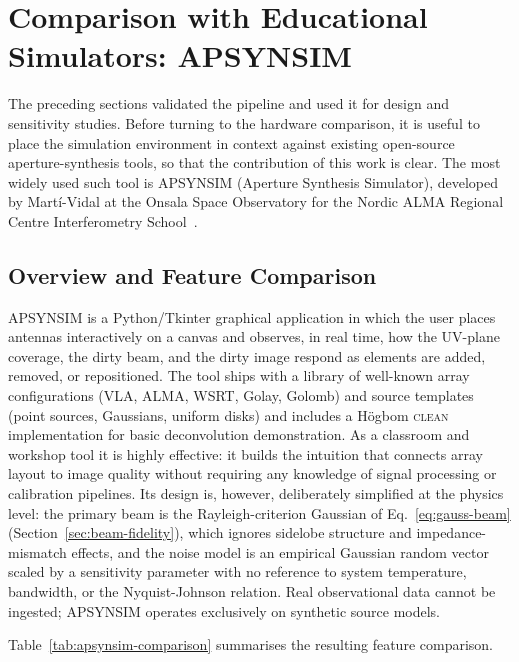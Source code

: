\section{Comparison with Educational Simulators: \textsc{APSYNSIM}}
\label{sec:apsynsim}

The preceding sections validated the pipeline and used it for design and sensitivity
studies. Before turning to the hardware comparison, it is useful to place the
simulation environment in context against existing open-source aperture-synthesis
tools, so that the contribution of this work is clear. The most widely used such tool
is \textsc{APSYNSIM} (Aperture Synthesis Simulator), developed by
Mart\'i-Vidal at the Onsala Space Observatory for the Nordic ALMA Regional Centre
Interferometry School~\cite{apsynsim}.

\subsection{Overview and Feature Comparison}

\textsc{APSYNSIM} is a Python/Tkinter graphical application in which the user places
antennas interactively on a canvas and observes, in real time, how the UV-plane
coverage, the dirty beam, and the dirty image respond as elements are added, removed,
or repositioned. The tool ships with a library of well-known array configurations
(VLA, ALMA, WSRT, Golay, Golomb) and source templates (point sources, Gaussians,
uniform disks) and includes a H\"ogbom \textsc{clean}~\citep{hogbom1974} implementation for basic
deconvolution demonstration. As a classroom and workshop tool it is highly effective:
it builds the intuition that connects array layout to image quality without requiring
any knowledge of signal processing or calibration pipelines. Its design is,
however, deliberately simplified at the physics level: the primary beam is the
Rayleigh-criterion Gaussian of Eq.~\eqref{eq:gauss-beam} (Section~\ref{sec:beam-fidelity}),
which ignores sidelobe structure and impedance-mismatch effects, and the noise model
is an empirical Gaussian random vector scaled by a sensitivity parameter with no
reference to system temperature, bandwidth, or the Nyquist-Johnson relation. Real
observational data cannot be ingested; \textsc{APSYNSIM} operates exclusively on
synthetic source models.

Table~\ref{tab:apsynsim-comparison} summarises the resulting feature comparison.

